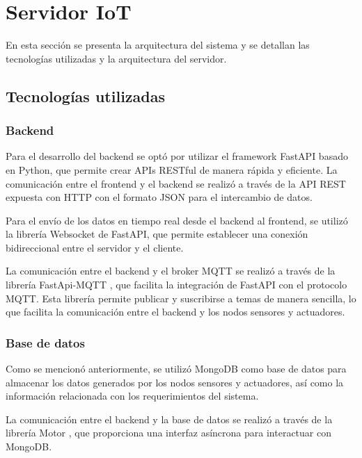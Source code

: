 \section{Servidor IoT}

En esta sección se presenta la arquitectura del sistema y se detallan las
tecnologías utilizadas y la arquitectura del servidor.

\subsection{Tecnologías utilizadas}

\subsubsection{Backend}

Para el desarrollo del backend se optó por utilizar el framework FastAPI basado
en Python, que permite crear APIs RESTful de manera rápida y eficiente. La
comunicación entre el frontend y el backend se realizó a través de la API REST
expuesta con HTTP con el formato JSON para el intercambio de datos.

Para el envío de los datos en tiempo real desde el backend al frontend, se
utilizó la librería Websocket \cite{FastAPIWebSockets} de FastAPI, que permite
establecer una conexión bidireccional entre el servidor y el cliente.

La comunicación entre el backend y el broker MQTT se realizó a través de la
librería FastApi-MQTT \cite{FastApiMQTT}, que facilita la integración de
FastAPI con el protocolo MQTT. Esta librería permite publicar y suscribirse a
temas de manera sencilla, lo que facilita la comunicación entre el backend y
los nodos sensores y actuadores.

\subsubsection{Base de datos}

Como se mencionó anteriormente, se utilizó MongoDB como base de datos para
almacenar los datos generados por los nodos sensores y actuadores, así como la
información relacionada con los requerimientos del sistema.

La comunicación entre el backend y la base de datos se realizó a través de la
librería Motor \cite{MotorMongoDB}, que proporciona una interfaz asíncrona para
interactuar con MongoDB.

